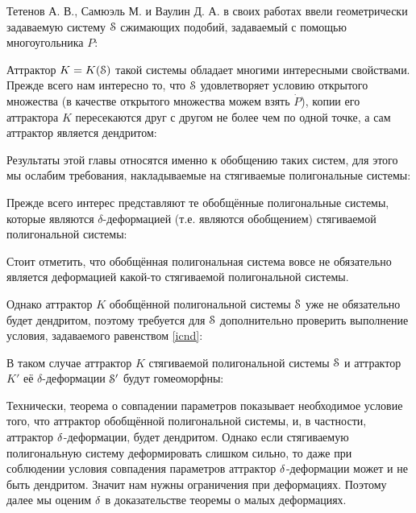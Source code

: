 Тетенов А. В., Самюэль М. и Ваулин Д. А. в своих работах \cite{TSV2017, STV2017} ввели геометрически задаваемую систему ${\EuScript S}$ сжимающих подобий, задаваемый с помощью многоугольника $P$:


Аттрактор $K=K({\EuScript S})$ такой системы обладает многими интересными свойствами.
Прежде всего нам интересно то, что ${\EuScript S}$ удовлетворяет условию открытого множества (в качестве открытого множества можем взять $\dot P$), копии его аттрактора $K$ пересекаются друг с другом не более чем по одной точке, а сам аттрактор является дендритом:


Результаты этой главы относятся именно к обобщению таких систем, для этого мы ослабим требования, накладываемые на стягиваемые полигональные системы:


Прежде всего интерес представляют те обобщённые полигональные системы, которые являются $\delta$-деформацией (т.е. являются обобщением) стягиваемой полигональной системы:


Стоит отметить, что обобщённая полигональная система вовсе не обязательно является деформацией какой-то стягиваемой полигональной системы.

Однако аттрактор $K$ обобщённой полигональной системы ${\EuScript S}$ уже не обязательно будет дендритом, поэтому требуется для ${\EuScript S}$ дополнительно проверить выполнение условия, задаваемого равенством \eqref{icnd}:


В таком случае аттрактор $K$ стягиваемой полигональной системы ${\EuScript S}$ и аттрактор $K'$ её $\delta$-деформации ${\EuScript S}'$ будут гомеоморфны:


%
%
%


Технически, теорема о совпадении параметров показывает необходимое условие того, что аттрактор обобщённой полигональной системы, и, в частности, аттрактор $\delta$-деформации, будет дендритом. 
Однако если стягиваемую полигональную систему деформировать слишком сильно, то даже при соблюдении условия совпадения параметров аттрактор $\delta$-деформации может и не быть дендритом. 
Значит нам нужны ограничения при деформациях. 
Поэтому далее мы оценим $\delta$ в доказательстве теоремы о малых деформациях. 





